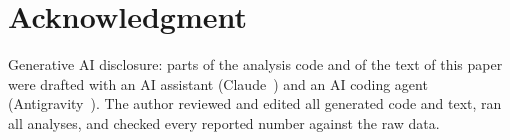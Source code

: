 \documentclass[conference]{IEEEtran}
\begin{document}
\section*{Acknowledgment}
Generative AI disclosure: parts of the analysis code and of the text of this paper were drafted with an AI
assistant (Claude~\cite{anthropic2026claude}) and an AI coding agent (Antigravity~\cite{google2025antigravity}).
The author reviewed and edited all generated code and text, ran all analyses, and checked every reported
number against the raw data.



\end{document}
